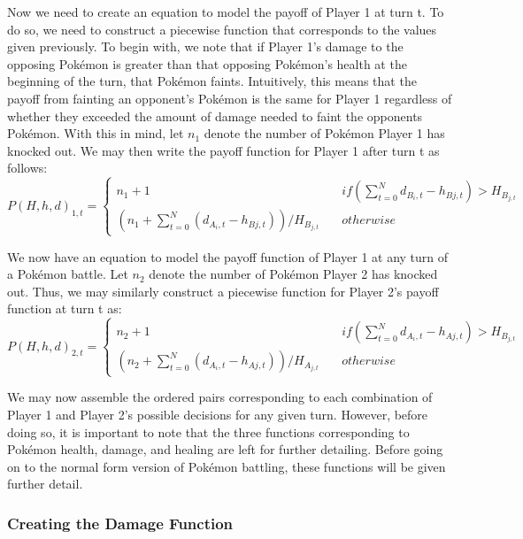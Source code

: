 \documentclass[12pt,twoside]{reedthesis}
\begin{document}
  Now we need to create an equation to model the payoff of Player 1 at
  turn t. To do so, we need to construct a piecewise function that
  corresponds to the values given previously. To begin with, we note that
  if Player 1's damage to the opposing Pokémon is greater than that
  opposing Pokémon's health at the beginning of the turn, that Pokémon
  faints. Intuitively, this means that the payoff from fainting an
  opponent's Pokémon is the same for Player 1 regardless of whether they
  exceeded the amount of damage needed to faint the opponents Pokémon.
  With this in mind, let \(n_1\) denote the number of Pokémon Player 1 has
  knocked out. We may then write the payoff function for Player 1 after
  turn t as follows: \[P(H,h,d)_{1,t} = \left\{
          \begin{array}{ll}
              n_1 +1  &\quad if (\sum_{t=0}^{N} d_{B_i,t} - h_{B{j,t}}) > H_{B_{j,t}}\\
              (n_1 + \sum_{t=0}^{N} (d_{A_i,t} - h_{B{j,t}}))/H_{B_{j,t}}& \quad otherwise
          \end{array}
      \right.
  \]
  
  We now have an equation to model the payoff function of Player 1 at any
  turn of a Pokémon battle. Let \(n_2\) denote the number of Pokémon
  Player 2 has knocked out. Thus, we may similarly construct a piecewise
  function for Player 2's payoff function at turn t as:
  \[P(H,h,d)_{2,t} = \left\{
          \begin{array}{ll}
              n_2 + 1  &\quad if (\sum_{t=0}^{N} d_{A_i,t} - h_{A{j,t}}) > H_{B_{j,t}}\\
              (n_2 + \sum_{t=0}^{N} (d_{A_i,t} - h_{A{j,t}}))/H_{A_{j,t}}& \quad otherwise
          \end{array}
      \right.
  \]
  
  We may now assemble the ordered pairs corresponding to each combination
  of Player 1 and Player 2's possible decisions for any given turn.
  However, before doing so, it is important to note that the three
  functions corresponding to Pokémon health, damage, and healing are left
  for further detailing. Before going on to the normal form version of
  Pokémon battling, these functions will be given further detail.
  
  \subsubsection{Creating the Damage
  Function}\label{creating-the-damage-function}
  
\end{document}
